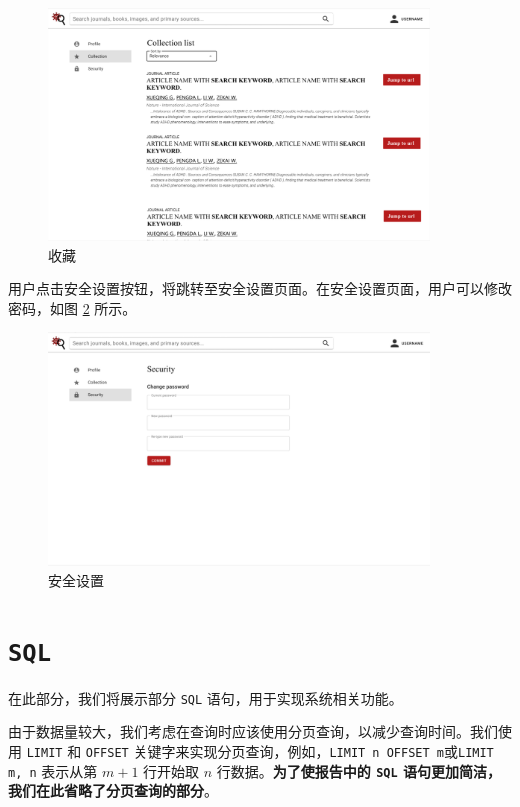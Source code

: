 \documentclass[UTF8,openany]{ctexbook}
\begin{document}
\begin{figure}[H]
\centering
\includegraphics[width=0.9\textwidth]{img/9.png}
\caption{收藏}
\label{fig:collect}
\end{figure}

用户点击安全设置按钮，将跳转至安全设置页面。在安全设置页面，用户可以修改密码，如图 \ref{fig:security} 所示。

\begin{figure}[H]
\centering
\includegraphics[width=0.9\textwidth]{img/10.png}
\caption{安全设置}
\label{fig:security}
\end{figure}

\chapter{\texttt{SQL}}

在此部分，我们将展示部分 \texttt{SQL} 语句，用于实现系统相关功能。

由于数据量较大，我们考虑在查询时应该使用分页查询，以减少查询时间。我们使用 \texttt{LIMIT} 和 \texttt{OFFSET} 关键字来实现分页查询，例如，\texttt{LIMIT n OFFSET m}或\texttt{LIMIT m, n} 表示从第 $m+1$ 行开始取 $n$ 行数据。\textbf{为了使报告中的 \texttt{SQL} 语句更加简洁，我们在此省略了分页查询的部分}。
\end{document}
